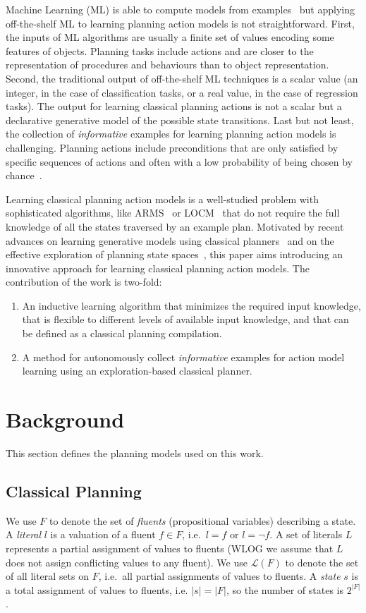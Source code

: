 \documentclass[letterpaper]{article} %
\begin{document}
Machine Learning (ML) is able to compute models from examples~\cite{michalski2013machine} but applying off-the-shelf ML to learning planning action models is not straightforward. First, the inputs of ML algorithms are usually a finite set of values encoding some features of objects. Planning tasks include actions and are closer to the representation of procedures and behaviours than to object representation. Second, the traditional output of off-the-shelf ML techniques is a scalar value (an integer, in the case of classification tasks, or a real value, in the case of regression tasks). The output for learning classical planning actions is not a scalar but a declarative generative model of the possible state transitions. Last but not least, the collection of {\em informative} examples for learning planning action models is challenging. Planning actions include preconditions that are only satisfied by specific sequences of actions and often with a low probability of being chosen by chance~\cite{fern2004learning}.

Learning classical planning action models is a well-studied problem with sophisticated algorithms, like ARMS~\cite{yang2007learning} or LOCM~\cite{cresswell2013acquiring} that do not require the full knowledge of all the states traversed by an example plan. Motivated by recent advances on learning generative models using classical planners~\cite{segovia2017generating} and on the effective exploration of planning state spaces~\cite{geffner:novelty:IJCAI17}, this paper aims introducing an innovative approach for learning classical planning action models. The contribution of the work is two-fold:
\begin{enumerate}
\item An inductive learning algorithm that minimizes the required input knowledge, that is flexible to different levels of available input knowledge, and that can be defined as a classical planning compilation. 
\item A method for autonomously collect {\em informative} examples for action model learning using an exploration-based classical planner.
\end{enumerate}


\section{Background}
This section defines the planning models used on this work.

\subsection{Classical Planning}
We use $F$ to denote the set of {\em fluents} (propositional variables) describing a state. A {\em literal} $l$ is a valuation of a fluent $f\in F$, i.e.~$l=f$ or $l=\neg f$. A set of literals $L$ represents a partial assignment of values to fluents (WLOG we assume that $L$ does not assign conflicting values to any fluent). We use $\mathcal{L}(F)$ to denote the set of all literal sets on $F$, i.e.~all partial assignments of values to fluents. A {\em state} $s$ is a total assignment of values to fluents, i.e. $|s|=|F|$, so the number of states is $2^{|F|}$. 
\end{document}
